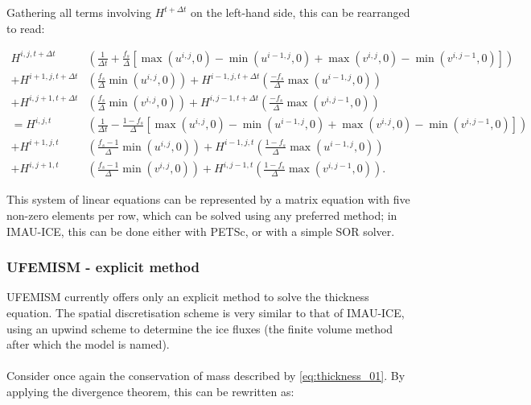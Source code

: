 \documentclass{article}
\begin{document}
Gathering all terms involving $H^{t+\Delta t}$ on the left-hand side, this can be rearranged to read:

\begin{equation} \label{eq:thickness_08}
\begin{split}
H^{i,j,t+\Delta t} & \left( \frac{1}{\Delta t} + \frac{f_s}{\Delta} \left[
\max \left( u^{i,j},0\right) - \min \left( u^{i-1,j},0\right) + 
\max \left( v^{i,j},0\right) - \min \left( v^{i,j-1},0\right) \right] \right) \\
+ H^{i+1,j,t+\Delta t} & \left( \frac{f_s}{\Delta} \min \left( u^{i,j},0\right) \right)
+ H^{i-1,j,t+\Delta t} \left( \frac{-f_s}{\Delta} \max \left( u^{i-1,j},0\right) \right) \\
+ H^{i,j+1,t+\Delta t} & \left( \frac{f_s}{\Delta} \min \left( v^{i,j},0\right) \right)
+ H^{i,j-1,t+\Delta t} \left( \frac{-f_s}{\Delta} \max \left( v^{i,j-1},0\right) \right) \\
= H^{i,j,t} & \left( \frac{1}{\Delta t} - \frac{1-f_s}{\Delta} \left[ 
\max \left( u^{i,j},0\right) - \min \left( u^{i-1,j},0\right) + 
\max \left( v^{i,j},0\right) - \min \left( v^{i,j-1},0\right) \right] \right) \\
+ H^{i+1,j,t} & \left( \frac{f_s - 1}{\Delta} \min \left( u^{i,j},0 \right) \right)
+ H^{i-1,j,t} \left( \frac{1 - f_s}{\Delta} \max \left( u^{i-1,j},0 \right) \right) \\
+ H^{i,j+1,t} & \left( \frac{f_s - 1}{\Delta} \min \left( v^{i,j},0 \right) \right)
+ H^{i,j-1,t} \left( \frac{1 - f_s}{\Delta} \max \left( v^{i,j-1},0 \right) \right).
\end{split}
\end{equation}

This system of linear equations can be represented by a matrix equation with five non-zero elements per row, which can be solved using any preferred method; in IMAU-ICE, this can be done either with PETSc, or with a simple SOR solver.

\subsubsection{UFEMISM - explicit method}

UFEMISM currently offers only an explicit method to solve the thickness equation. The spatial discretisation scheme is very similar to that of IMAU-ICE, using an upwind scheme to determine the ice fluxes (the finite volume method after which the model is named).\\
\\
Consider once again the conservation of mass described by \eqref{eq:thickness_01}. By applying the divergence theorem, this can be rewritten as:
\end{document}
